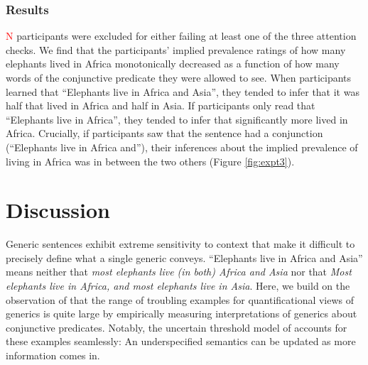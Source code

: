 \documentclass[10pt,letterpaper]{article}
\newcommand{\red}[1]{{\textcolor{Red}{#1}}}
\begin{document}
 \subsubsection{Results}


\red{N} participants were excluded for either failing at least one of the three attention checks.
We find that the participants' implied prevalence ratings of how many elephants lived in Africa monotonically decreased as a function of how many words of the conjunctive predicate they were allowed to see. 
When participants learned that ``Elephants live in Africa and Asia'', they tended to infer that it was half that lived in Africa and half in Asia.
If participants only read that ``Elephants live in Africa'', they tended to infer that significantly more lived in Africa. 
Crucially, if participants saw that the sentence had a conjunction (``Elephants live in Africa and''), their inferences about the implied prevalence of living in Africa was in between the two others (Figure \ref{fig:expt3}).


\section{Discussion}

Generic sentences exhibit extreme sensitivity to context that make it difficult to precisely define what a single generic conveys. 
``Elephants live in Africa and Asia'' means neither that \emph{most elephants live (in both) Africa and Asia} nor that \emph{Most elephants live in Africa, and most elephants live in Asia}.
Here, we build on the observation of  that the range of troubling examples for quantificational views of generics is quite large by empirically measuring interpretations of generics about conjunctive predicates.  
Notably, the uncertain threshold model of  accounts for these examples seamlessly: An underspecified semantics can be updated as more information comes in. 
\end{document}
